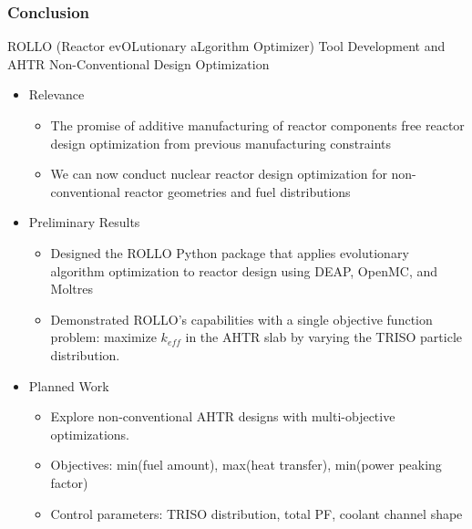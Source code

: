 \begin{frame}
    \frametitle{Conclusion}
    ROLLO (Reactor evOLutionary aLgorithm Optimizer) Tool Development and AHTR 
    Non-Conventional Design Optimization
    \begin{itemize}
        \item Relevance
        \begin{itemize}
            \item The promise of additive manufacturing of reactor components 
            free reactor design optimization from previous manufacturing constraints
            \item We can now conduct nuclear reactor design optimization for 
            non-conventional reactor geometries and fuel distributions
        \end{itemize}
        \item Preliminary Results
        \begin{itemize}
            \item Designed the ROLLO Python package that applies 
            evolutionary algorithm optimization to reactor design using 
            DEAP, OpenMC, and Moltres
            \item Demonstrated ROLLO's capabilities with a single objective function 
            problem: maximize $k_{eff}$ in the AHTR slab by varying the 
            TRISO particle distribution. 
        \end{itemize} 
        \item Planned Work
        \begin{itemize}
            \item Explore non-conventional AHTR designs with multi-objective optimizations. 
            \item Objectives: min(fuel amount), max(heat transfer), min(power peaking factor) 
            \item Control parameters: TRISO distribution, total PF, coolant channel shape 
        \end{itemize}
    \end{itemize}
    \vspace{-0.4cm}
    \begin{figure}[]
        \centering
    \end{figure}
\end{frame}